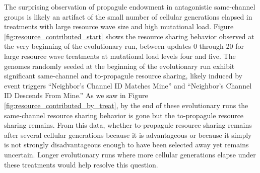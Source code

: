 The surprising observation of propagule endowment in antagonistic same-channel groups is likely an artifact of the small number of cellular generations elapsed in treatments with large resource wave size and high mutational load.
Figure \ref{fig:resource_contributed_start} shows the resource sharing behavior observed at the very beginning of the evolutionary run, between updates 0 through 20 for large resource wave treatments at mutational load levels four and five.
The genomes randomly seeded at the beginning of the evolutionary run exhibit significant same-channel and to-propagule resource sharing, likely induced by event triggers ``Neighbor's Channel ID Matches Mine'' and ``Neighbor's Channel ID Descends From Mine.''
As we saw in Figure \ref{fig:resource_contributed_by_treat}, by the end of these evolutionary runs the same-channel resource sharing behavior is gone but the to-propagule resource sharing remains.
From this data, whether to-propagule resource sharing remains after several cellular generations because it is advantageous or because it simply is not strongly disadvantageous enough to have been selected away yet remains uncertain.
Longer evolutionary runs where more cellular generations elapse under these treatments would help resolve this question.
